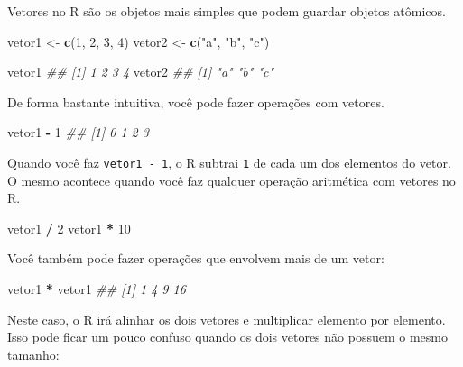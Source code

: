 \documentclass[
]{book}
\newenvironment{Shaded}{\begin{snugshade}}{\end{snugshade}}
\newcommand{\CommentTok}[1]{\textcolor[rgb]{0.56,0.35,0.01}{\textit{#1}}}
\newcommand{\DecValTok}[1]{\textcolor[rgb]{0.00,0.00,0.81}{#1}}
\newcommand{\KeywordTok}[1]{\textcolor[rgb]{0.13,0.29,0.53}{\textbf{#1}}}
\newcommand{\NormalTok}[1]{#1}
\newcommand{\OperatorTok}[1]{\textcolor[rgb]{0.81,0.36,0.00}{\textbf{#1}}}
\newcommand{\StringTok}[1]{\textcolor[rgb]{0.31,0.60,0.02}{#1}}
\begin{document}
Vetores no R são os objetos mais simples que podem guardar objetos atômicos.

\begin{Shaded}
\begin{Highlighting}[]
\NormalTok{vetor1 <-}\StringTok{ }\KeywordTok{c}\NormalTok{(}\DecValTok{1}\NormalTok{, }\DecValTok{2}\NormalTok{, }\DecValTok{3}\NormalTok{, }\DecValTok{4}\NormalTok{)}
\NormalTok{vetor2 <-}\StringTok{ }\KeywordTok{c}\NormalTok{(}\StringTok{"a"}\NormalTok{, }\StringTok{"b"}\NormalTok{, }\StringTok{"c"}\NormalTok{)}

\NormalTok{vetor1}
\CommentTok{## [1] 1 2 3 4}
\NormalTok{vetor2}
\CommentTok{## [1] "a" "b" "c"}
\end{Highlighting}
\end{Shaded}

De forma bastante intuitiva, você pode fazer operações com vetores.

\begin{Shaded}
\begin{Highlighting}[]
\NormalTok{vetor1 }\OperatorTok{-}\StringTok{ }\DecValTok{1}
\CommentTok{## [1] 0 1 2 3}
\end{Highlighting}
\end{Shaded}

Quando você faz \texttt{vetor1\ -\ 1}, o R subtrai \texttt{1} de cada um dos elementos do vetor. O mesmo acontece quando você faz qualquer operação aritmética com vetores no R.

\begin{Shaded}
\begin{Highlighting}[]
\NormalTok{vetor1 }\OperatorTok{/}\StringTok{ }\DecValTok{2}
\NormalTok{vetor1 }\OperatorTok{*}\StringTok{ }\DecValTok{10}
\end{Highlighting}
\end{Shaded}

Você também pode fazer operações que envolvem mais de um vetor:

\begin{Shaded}
\begin{Highlighting}[]
\NormalTok{vetor1 }\OperatorTok{*}\StringTok{ }\NormalTok{vetor1}
\CommentTok{## [1]  1  4  9 16}
\end{Highlighting}
\end{Shaded}

Neste caso, o R irá alinhar os dois vetores e multiplicar elemento por elemento. Isso pode ficar um pouco confuso quando os dois vetores não possuem o mesmo tamanho:
\end{document}
